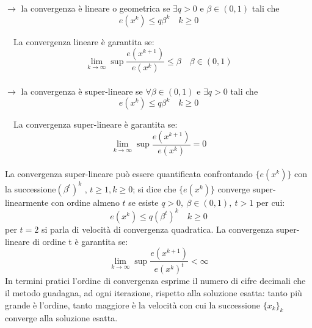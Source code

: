 \documentclass{report}
\begin{document}
$\rightarrow$ la convergenza è lineare o geometrica se $\exists q > 0$ e $\beta \in (0,1)$ tali che
\begin{equation}
	e(x^k) \leqslant q \beta^k \quad k \geqslant 0
\end{equation}

$\quad$La convergenza lineare è garantita se:
\begin{equation}
	\lim_{k \rightarrow \infty} \sup \frac{e(x^{k+1})}{e(x^k)} \leqslant \beta \quad \beta \in (0,1)
\end{equation}
\\

$\rightarrow$ la convergenza è super-lineare se $\forall \beta \in (0,1)$ e $\exists q > 0$ tali che
\begin{equation}
	e(x^k) \leqslant q \beta^k \quad k \geqslant 0
\end{equation}

$\quad$La convergenza super-lineare è garantita se:
\begin{equation}
	\lim_{k \rightarrow \infty} \sup \frac{e(x^{k+1})}{e(x^k)} = 0
\end{equation}
\\

La convergenza super-lineare può essere quantificata confrontando $\{e(x^k )\}$ con la successione${(\beta^t)}^k$ , $t \geqslant 1, k \geqslant 0$; si dice che $\{e(x^k )\}$ converge super-linearmente con ordine almeno $t$ se esiste $q > 0,\ \beta \in (0, 1),\ t > 1$ per cui:
\begin{equation}
	e(x^k) \leqslant q {(\beta^t)}^k \quad k \geqslant 0
\end{equation}
per $t = 2$ si parla di velocità di convergenza quadratica. La convergenza super-lineare di ordine t è garantita se:
\begin{equation}
	\lim_{k \rightarrow \infty} \sup \frac{e(x^{k+1})}{e(x^k)^t} < \infty
\end{equation}
In termini pratici l'ordine di convergenza esprime il numero di cifre decimali che il metodo guadagna, ad ogni iterazione, rispetto alla soluzione esatta: tanto più grande è l'ordine, tanto maggiore è la velocità con cui la successione $\{x_k\}_k$  converge alla soluzione esatta.
\\
\end{document}
